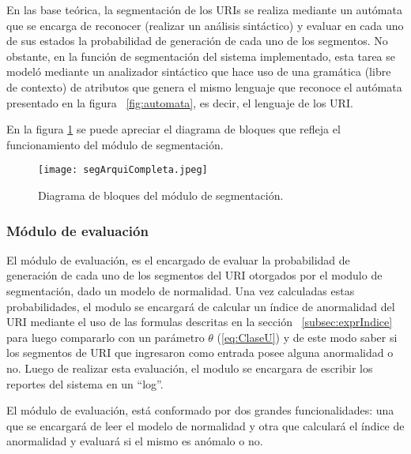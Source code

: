  En las base teórica, la segmentación de los URIs se realiza mediante un autómata que se encarga de reconocer (realizar un análisis sintáctico) y evaluar en cada uno de sus estados la probabilidad de generación de cada uno de los segmentos.  No obstante, en la función de segmentación del sistema implementado, esta tarea se modeló mediante un analizador sintáctico que hace uso de una gramática (libre de contexto) de atributos que genera el mismo lenguaje que reconoce el autómata presentado en la figura ~\ref{fig:automata}, es decir, el lenguaje de los URI.

En la figura \ref{fig:arquiSegmentacion} se puede apreciar el diagrama de bloques que refleja el funcionamiento del módulo de segmentación.

\begin{figure}[tb]
\begin{center}
\texttt{[image: segArquiCompleta.jpeg]}
\caption{Diagrama de bloques del módulo de segmentación.}
\label{fig:arquiSegmentacion}
\end{center}
\end{figure}

\subsubsection{Módulo de evaluación}
\label{sec:evaluacion}

El módulo de evaluación, es el encargado de evaluar la probabilidad de generación de cada uno de los segmentos del URI otorgados por el modulo de segmentación, dado un modelo de normalidad. Una vez calculadas estas probabilidades, el modulo se encargará de calcular un índice de anormalidad del URI mediante el uso de las formulas descritas en la sección ~\ref{subsec:exprIndice} para luego compararlo con un parámetro $\theta$ (\ref{eq:ClaseU}) y de este modo saber si los segmentos de URI que ingresaron como entrada posee alguna anormalidad o no. Luego de realizar esta evaluación, el modulo se encargara de escribir los reportes del sistema en un ``log''.

El módulo de evaluación, está conformado por dos grandes funcionalidades: una que se encargará de leer el modelo de normalidad y  otra que calculará el índice de anormalidad y evaluará si el mismo es anómalo o no. 

